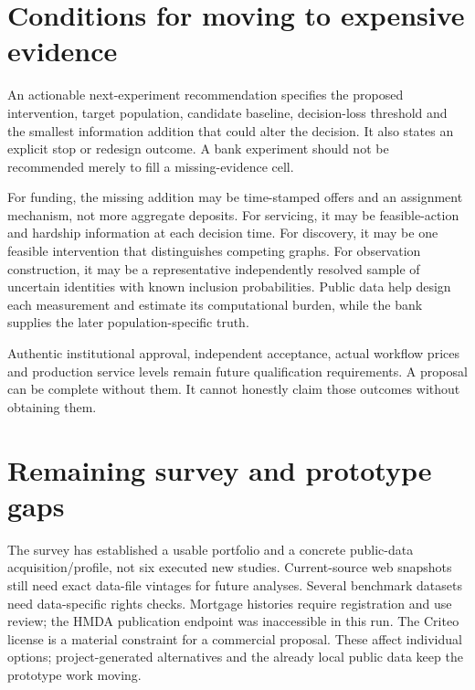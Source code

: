 \hypertarget{conditions-for-moving-to-expensive-evidence}{%
\section{Conditions for moving to expensive
evidence}\label{conditions-for-moving-to-expensive-evidence}}

An actionable next-experiment recommendation specifies the proposed
intervention, target population, candidate baseline, decision-loss
threshold and the smallest information addition that could alter the
decision. It also states an explicit stop or redesign outcome. A bank
experiment should not be recommended merely to fill a missing-evidence
cell.

For funding, the missing addition may be time-stamped offers and an
assignment mechanism, not more aggregate deposits. For servicing, it may
be feasible-action and hardship information at each decision time. For
discovery, it may be one feasible intervention that distinguishes
competing graphs. For observation construction, it may be a
representative independently resolved sample of uncertain identities
with known inclusion probabilities. Public data help design each
measurement and estimate its computational burden, while the bank
supplies the later population-specific truth.

Authentic institutional approval, independent acceptance, actual
workflow prices and production service levels remain future
qualification requirements. A proposal can be complete without them. It
cannot honestly claim those outcomes without obtaining them.

\hypertarget{remaining-survey-and-prototype-gaps}{%
\section{Remaining survey and prototype
gaps}\label{remaining-survey-and-prototype-gaps}}

The survey has established a usable portfolio and a concrete public-data
acquisition/profile, not six executed new studies. Current-source web
snapshots still need exact data-file vintages for future analyses.
Several benchmark datasets need data-specific rights checks. Mortgage
histories require registration and use review; the HMDA publication
endpoint was inaccessible in this run. The Criteo license is a material
constraint for a commercial proposal. These affect individual options;
project-generated alternatives and the already local public data keep
the prototype work moving.

